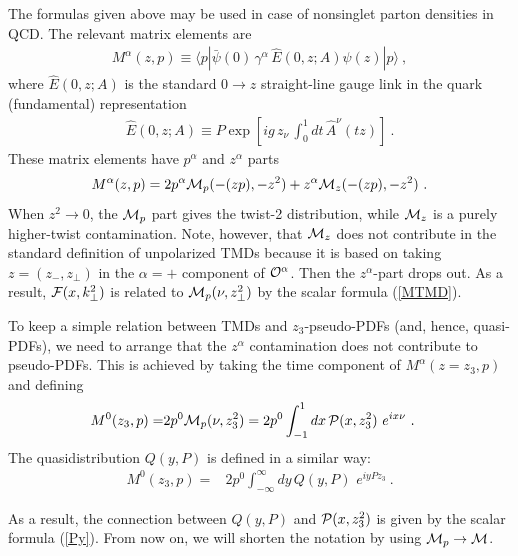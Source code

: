 \documentclass[final,5p,times,twocolumn]{elsarticle}
\begin{document}
 The formulas given above 
may be used in case of  nonsinglet parton densities   in QCD.
The relevant matrix elements  are 
    \begin{align}
 { M}^\alpha  (z,p) \equiv \langle  p |  \bar \psi (0) \,
 \gamma^\alpha \,  { \hat E} (0,z; A) \psi (z) | p \rangle \  , 
\end{align}
 where  $
{ \hat E}(0,z; A)$ is  the  standard  $0\to z$ straight-line gauge link 
 in the quark (fundamental) 
 representation
 \begin{align}
{ \hat E}(0,z; A) \equiv P \exp{ \left [ ig \,  z_\nu\, \int_0^1dt \,  \hat  A^\nu (t z) 
 \right ] }    \  . 
 \label{straightE}
\end{align}
 These matrix elements   have  $p^\alpha$ and $z^\alpha$ parts
    \begin{align}
{ M}^\alpha  (z,p) =2 p^\alpha  {\cal M}_p (-(zp), -z^2) + z^\alpha  {\cal M}_z (-(zp),-z^2)
\ . 
\end{align}
When  $z^2 \to 0$,
the ${\cal M}_p $ part gives the twist-2 distribution,  
while $ {\cal M}_z $ is a  purely higher-twist contamination. 
Note, 
however,  that $ {\cal M}_z $  does not  contribute
 in the standard 
definition of  unpolarized TMDs  because
it is  based on taking $z=(z_-, z_\perp)$ in the $\alpha=+$  component of 
${\cal O}^\alpha$.  Then the   \mbox{$z^\alpha$-part}  drops out.
As  a result,   
   ${\cal F}(x, k_\perp^2)$   is 
 related to  $ {\cal M}_p (\nu, z_\perp^2)$  by the scalar formula 
(\ref{MTMD}).  

To keep a simple relation between TMDs and \mbox{$z_3$-pseudo-PDFs} 
(and, hence, quasi-PDFs), we need to   arrange that 
 the $z^\alpha$ contamination does not contribute to pseudo-PDFs. This is achieved by    taking  the
  time component of \mbox{$ {M}^\alpha  (z=z_3,p)$}  and defining 
   \begin{align}
 { M}^0   (z_3,p)= & 2 p^0    {\cal M}_p   (\nu,z_3^2)   
  =   2 p^0   
 \int_{-1}^1 dx \,  
{\cal P} (x,  z_3^2)   \, 
 \,  e^{i  x\nu   }  \  . 
 \label{MpP}
\end{align} 
The quasidistribution $Q(y,P) $
is defined in a similar way:
 \begin{align}
{ M}^0   (z_3,p)= & 2 p^0  
 \int_{-\infty}^\infty dy\,  
Q(y,P) \, 
 \,  e^{i  y Pz_3 }  \  . 
 \label{OPhixspin12}
\end{align} 


As a result,   the  connection between $Q(y,P)$   and 
 ${\cal P} (x,  z_3^2) $ is given 
by the scalar  formula (\ref{Py}). 
From now on, we will  shorten the notation by using  $ {\cal M}_p \to  {\cal M}$.
\end{document}
